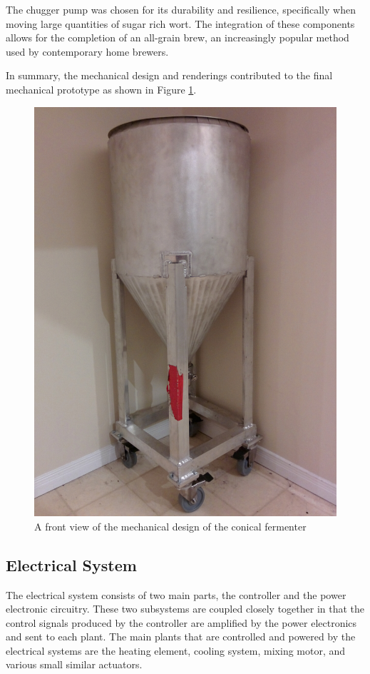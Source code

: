 \documentclass{article}
\begin{document}
The chugger pump \cite{chugger} was chosen for its durability and resilience, specifically when moving large quantities of sugar rich \gls{wort}.  The integration of these components allows for the completion of an all-grain brew, an increasingly popular method used by contemporary home brewers.

In summary, the mechanical design and renderings contributed to the final mechanical prototype as shown in Figure \ref{fig:mechanical-prototype}.

\begin{figure}[H]
\begin{center}
\includegraphics[scale=0.10]{mechanical-prototype.jpg}
\caption{A front view of the mechanical design of the conical fermenter}
\label{fig:mechanical-prototype}
\end{center}
\end{figure}

\subsection{Electrical System}
The electrical system consists of two main parts, the controller and the power electronic circuitry. These two subsystems are coupled closely together in that the control signals produced by the controller are amplified by the power electronics and sent to each plant. The main plants that are controlled and powered by the electrical systems are the heating element, cooling system, mixing motor, and various small similar actuators.
\end{document}
